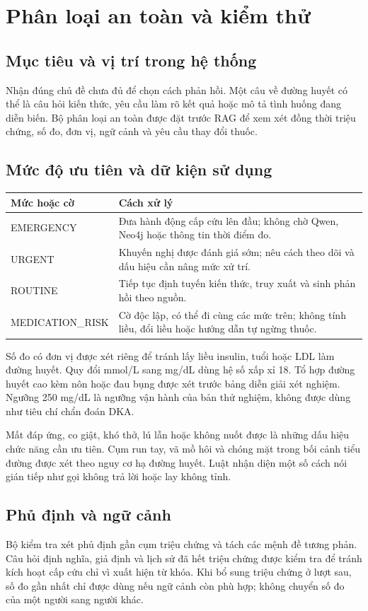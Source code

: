 \chapter{Phân loại an toàn và kiểm thử}
\section{Mục tiêu và vị trí trong hệ thống}
Nhận đúng chủ đề chưa đủ để chọn cách phản hồi. Một câu về đường huyết có thể là câu hỏi kiến thức, yêu cầu làm rõ kết quả hoặc mô tả tình huống đang diễn biến. Bộ phân loại an toàn được đặt trước RAG để xem xét đồng thời triệu chứng, số đo, đơn vị, ngữ cảnh và yêu cầu thay đổi thuốc.
\section{Mức độ ưu tiên và dữ kiện sử dụng}
\begin{longtable}{p{4.3cm}p{9.7cm}}\toprule Mức hoặc cờ & Cách xử lý\\\midrule
EMERGENCY & Đưa hành động cấp cứu lên đầu; không chờ Qwen, Neo4j hoặc thông tin thời điểm đo.\\
URGENT & Khuyến nghị được đánh giá sớm; nêu cách theo dõi và dấu hiệu cần nâng mức xử trí.\\
ROUTINE & Tiếp tục định tuyến kiến thức, truy xuất và sinh phản hồi theo nguồn.\\
MEDICATION\_RISK & Cờ độc lập, có thể đi cùng các mức trên; không tính liều, đổi liều hoặc hướng dẫn tự ngừng thuốc.\\\bottomrule\end{longtable}
Số đo có đơn vị được xét riêng để tránh lấy liều insulin, tuổi hoặc LDL làm đường huyết. Quy đổi mmol/L sang mg/dL dùng hệ số xấp xỉ 18. Tổ hợp đường huyết cao kèm nôn hoặc đau bụng được xét trước bảng diễn giải xét nghiệm. Ngưỡng 250 mg/dL là ngưỡng vận hành của bản thử nghiệm, không được dùng như tiêu chí chẩn đoán DKA.

Mất đáp ứng, co giật, khó thở, lú lẫn hoặc không nuốt được là những dấu hiệu chức năng cần ưu tiên. Cụm run tay, vã mồ hôi và chóng mặt trong bối cảnh tiểu đường được xét theo nguy cơ hạ đường huyết. Luật nhận diện một số cách nói gián tiếp như gọi không trả lời hoặc lay không tỉnh.
\section{Phủ định và ngữ cảnh}
Bộ kiểm tra xét phủ định gần cụm triệu chứng và tách các mệnh đề tương phản. Câu hỏi định nghĩa, giả định và lịch sử đã hết triệu chứng được kiểm tra để tránh kích hoạt cấp cứu chỉ vì xuất hiện từ khóa. Khi bổ sung triệu chứng ở lượt sau, số đo gần nhất chỉ được dùng nếu ngữ cảnh còn phù hợp; không chuyển số đo của một người sang người khác.
